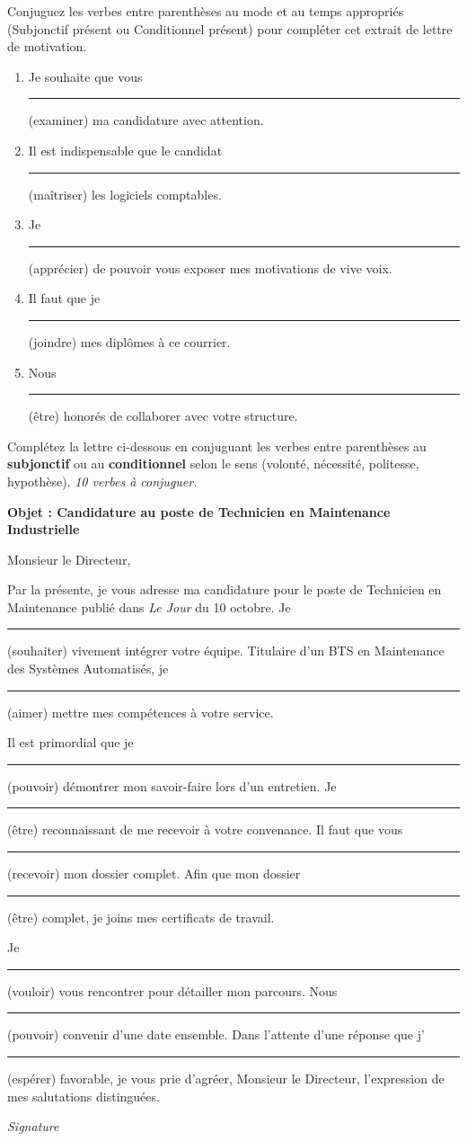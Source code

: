 \documentclass[11pt]{article}
\newcounter{popsec}
\newcounter{popsub}
\newcommand{\courssub}[1]{%
  \stepcounter{popsub}%
  \par\vspace{9pt}\noindent{\popxbold\fontsize{11.5}{13}\selectfont\color{popink}{\color{poporange}\thepopsec.\thepopsub}\hspace{6pt}#1}\par\nopagebreak\vspace{4pt}
}
\begin{document}
\begin{exercice}
Conjuguez les verbes entre parenthèses au mode et au temps appropriés (Subjonctif présent ou Conditionnel présent) pour compléter cet extrait de lettre de motivation.
\begin{enumerate}
    \item Je souhaite que vous \rule{3cm}{0.4pt} (examiner) ma candidature avec attention.
    \item Il est indispensable que le candidat \rule{3cm}{0.4pt} (maîtriser) les logiciels comptables.
    \item Je \rule{3cm}{0.4pt} (apprécier) de pouvoir vous exposer mes motivations de vive voix.
    \item Il faut que je \rule{3cm}{0.4pt} (joindre) mes diplômes à ce courrier.
    \item Nous \rule{3cm}{0.4pt} (être) honorés de collaborer avec votre structure.
\end{enumerate}
\end{exercice}

\courssub{Je m'entraîne}

\begin{exercice}
Complétez la lettre ci-dessous en conjuguant les verbes entre parenthèses au \textbf{subjonctif} ou au \textbf{conditionnel} selon le sens (volonté, nécessité, politesse, hypothèse). \textit{10 verbes à conjuguer.}

\textbf{Objet : Candidature au poste de Technicien en Maintenance Industrielle}

Monsieur le Directeur,

Par la présente, je vous adresse ma candidature pour le poste de Technicien en Maintenance publié dans \emph{Le Jour} du 10 octobre. Je \rule{2cm}{0.4pt} (souhaiter) vivement intégrer votre équipe. Titulaire d'un BTS en Maintenance des Systèmes Automatisés, je \rule{2cm}{0.4pt} (aimer) mettre mes compétences à votre service.

Il est primordial que je \rule{2cm}{0.4pt} (pouvoir) démontrer mon savoir-faire lors d'un entretien. Je \rule{2cm}{0.4pt} (être) reconnaissant de me recevoir à votre convenance. Il faut que vous \rule{2cm}{0.4pt} (recevoir) mon dossier complet. Afin que mon dossier \rule{2cm}{0.4pt} (être) complet, je joins mes certificats de travail.

Je \rule{2cm}{0.4pt} (vouloir) vous rencontrer pour détailler mon parcours. Nous \rule{2cm}{0.4pt} (pouvoir) convenir d'une date ensemble. Dans l'attente d'une réponse que j'\rule{2cm}{0.4pt} (espérer) favorable, je vous prie d'agréer, Monsieur le Directeur, l'expression de mes salutations distinguées.

\textit{Signature}
\end{exercice}
\end{document}
